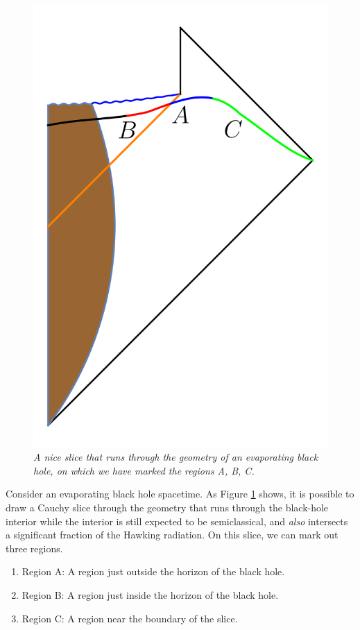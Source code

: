 \documentclass[12pt]{article}
\begin{document}
\begin{figure}[!ht]
\begin{center}
\includegraphics[height=0.4\textheight]{penroseabcmarked.png}
\caption{\em A nice slice that runs through the geometry of an evaporating black hole, on which we have marked the regions A, B, C. \label{penroseabc}}
\end{center}
\end{figure}


Consider an evaporating black hole spacetime. As Figure \ref{penroseabc} shows, it is possible to draw a Cauchy slice
through the geometry that runs through the black-hole interior while the interior is still expected to be semiclassical, and {\em also} intersects a significant fraction of the Hawking radiation. On this slice, we can mark out three regions.
\begin{enumerate}
\item
Region A: A  region just outside the horizon of the black hole.
\item
Region B: A  region just inside the horizon of the black hole.
\item
Region C: A region near the boundary of the slice.
\end{enumerate}
\end{document}

